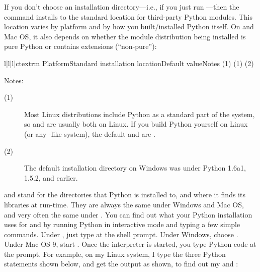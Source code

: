\documentclass{howto}
\begin{document}
If you don't choose an installation directory---i.e., if you just run
---then the  command installs to
the standard location for third-party Python modules.  This location
varies by platform and by how you built/installed Python itself.  On
\UNIX{} and Mac OS, it also depends on whether the module distribution
being installed is pure Python or contains extensions (``non-pure''):
\begin{tableiv}{l|l|l|c}{textrm}%
  {Platform}{Standard installation location}{Default value}{Notes}
          {}
          {}
          {(1)}
          {}
          {}
          {(1)}
          {}
          {}
          {(2)}
          {}
          {}
          {}
          {}
          {}
          {}
\end{tableiv}

\noindent Notes:
\begin{description}
\item[(1)] Most Linux distributions include Python as a standard part of
  the system, so  and  are usually
  both  on Linux.  If you build Python yourself on Linux (or
  any \UNIX-like system), the default  and
   are .
\item[(2)] The default installation directory on Windows was
   under
  Python 1.6a1, 1.5.2, and earlier.
\end{description}

 and  stand for the directories
that Python is installed to, and where it finds its libraries at
run-time.  They are always the same under Windows and Mac OS, and very
often the same under \UNIX.  You can find out what your Python
installation uses for  and  by
running Python in interactive mode and typing a few simple commands.
Under \UNIX, just type  at the shell prompt.  Under
Windows, choose .  Under Mac OS 9, start .
Once the interpreter is started, you type Python code at the
prompt.  For example, on my Linux system, I type the three Python
statements shown below, and get the output as shown, to find out my
 and :
\end{document}
